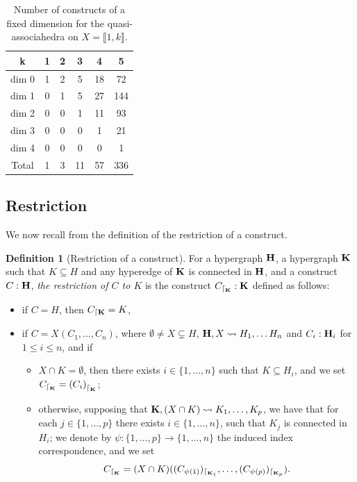 \documentclass{article}
\theoremstyle{plain}
\theoremstyle{definition}
\newtheorem{definition}[thm]{Definition}
\newcommand{\inc}{\subseteq}
\newcommand{\inter}{\cap}
\begin{document}
\begin{table}
\centering
\begin{tabular}{|c|c|c|c|c|c|}
\hline
k & 1 & 2 & 3 & 4 & 5 \\ \hline
dim 0 & 1 & 2 & 5 & 18& 72 \\ \hline
dim 1 & 0 & 1 & 5 & 27& 144 \\ \hline
dim 2 & 0& 0 & 1 & 11& 93 \\ \hline
dim 3 & 0 & 0 & 0 & 1 & 21 \\ \hline
dim 4 & 0 & 0 & 0 & 0 & 1 \\ \hline
Total & 1 & 3 & 11 & 57 & 336 \\ \hline
\end{tabular}
\caption{Number of constructs of a fixed dimension for the quasi-associahedra on $X=\llbracket 1,k \rrbracket$. \label{tableQA}}
\end{table}


\subsection{Restriction} \label{restriction-subsection}
We now recall from \cite[Section 4.4]{PLBJ1} the definition of the restriction of a construct.

 \begin{definition}[Restriction of a construct] \label{restriction-definition}
 For a hypergraph ${\bf H}$,
 a hypergraph ${\bf K}$ such that $K\subseteq H$ and any hyperedge of ${\bf K}$ is connected in ${\bf H}$, 
 and a construct $C:{\bf H}$, {\em the restriction of $C$ to $K$} is the construct $C_{\lceil_{\bf K}}:{\bf K}$ defined as follows:
\begin{itemize}
\item if $C=H$, then $C_{\lceil {\bf K}}=K$, 
\item if $C=X(C_1,\dots,C_n)$, where $\emptyset \neq X \subsetneq H$, ${\bf H},X\leadsto {H}_1,\dots { H}_n$ and $C_{i}:{\bf H}_{i}$ for $1\leq i\leq n$, and if
\begin{itemize}
\item $X\inter K=\emptyset$, then there exists $i\in\{1,\dots,n\}$ such that $K\inc H_i$, and we set $C_{\lceil_{\bf K}}={(C_{i})}_{\lceil_{\bf K}}$;
\item otherwise, supposing that ${\bf K},(X\inter K)\leadsto K_1,\dots,K_p$, we have that for each $j\in\{1,\dots,p\}$ there exists $i\in\{1,\dots,n\}$, such that $K_j$ is connected in $H_i$; we denote by $\psi:\{1,\dots,p\}\rightarrow \{1,\dots,n\}$ the induced index correspondence, and we set $$C_{\lceil_{\bf K}}=(X\inter K)((C_{\psi(1)})_{\lceil_{{\bf K}_1}},\dots,(C_{\psi(p)})_{\lceil_{{\bf K}_p}}).$$
\end{itemize}
\end{itemize}
\end{definition}
\end{document}
